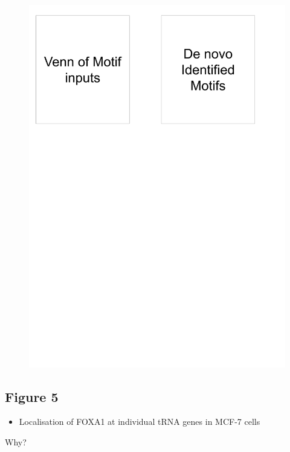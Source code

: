\documentclass[
  12pt,
]{article}
\providecommand{\tightlist}{%
  \setlength{\itemsep}{0pt}\setlength{\parskip}{0pt}}
\begin{document}
\begin{figure}[H]

{\centering \includegraphics[width=1\linewidth]{../images/results-04} 

}

\end{figure}

\hypertarget{figure-5}{%
\subsection{Figure 5}\label{figure-5}}

\begin{itemize}
\tightlist
\item
  Localisation of FOXA1 at individual tRNA genes in MCF-7 cells
\end{itemize}

Why?
\end{document}

